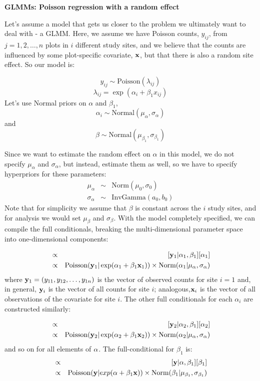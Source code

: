 {\flushleft \bf  GLMMs: Poisson regression with a random effect }

Let's assume a model that gets us closer to the problem we ultimately
want to deal with - a GLMM. Here, we assume we have Poisson counts,
$y_{ij}$, from $j=1,2,\ldots,n$ plots in $i$ different study sites,
and we believe that the counts are influenced by some plot-specific
covariate, ${\bf x}$, but that there is also a random site effect. So
our model is:
 
\[
y_{ij} \sim \mbox{Poisson}(\lambda_{ij})
\]
\[
\lambda_{ij} = \exp (\alpha_i + \beta_1 x_{ij})
\]
Let's use Normal priors on $\alpha$ and $\beta_1$,  \[
\alpha_i \sim \mbox{Normal} (\mu_{\alpha}, \sigma_{\alpha})
\]
and
\[
\beta \sim \mbox{Normal} (\mu_{\beta_1}, \sigma_{\beta_1})
\]

Since we want to estimate the random effect on $\alpha$ in this model, we do not
specify $\mu_{\alpha}$ and $\sigma_{\alpha}$, but instead, estimate them as well, so we have
to specify hyperpriors for these parameters:
\begin{eqnarray*}
\mu_{\alpha}  &\sim &  \mbox{Norm}(\mu_0, \sigma_0)  \\
\sigma_{\alpha} & \sim & \mbox{InvGamma}(a_0, b_0)
\end{eqnarray*}
Note that for simplicity we assume that $\beta$ is constant across the $i$ study sites, and for analysis we would set $\mu_{\beta}$ and $\sigma_{\beta}$.
With the model completely specified, we can compile the full conditionals,
breaking the multi-dimensional parameter space into one-dimensional
components:

\begin{eqnarray*}
[\alpha_1|\alpha_2,\alpha_3,\ldots,\alpha_i,\beta_1,{\bf y}_{1}] & \propto &   [{\bf y}_{1}|\alpha_1,\beta_1]  [\alpha_1] \\
	 & \propto  &   \mbox{Poisson}({\bf y}_{1}| \exp(\alpha_1 + \beta_1 {\bf x}_1)) \times \mbox{Norm}(\alpha_1|\mu_{\alpha} , \sigma_{\alpha})
\end{eqnarray*}
where ${\bf y}_{1} = (y_{11},y_{12}, \ldots, y_{1n})$ is the vector of
observed counts for site $i=1$ and, in general, ${\bf y}_{i}$ is the
vector of all counts for site $i$; analogous,${\bf x}_{i}$ is the
vector of all observations of the covariate for site $i$. The other full conditionals for
each $\alpha_{i}$ are constructed similarly:

\begin{eqnarray*}
[\alpha_2|\alpha_1,\alpha_3,\ldots,\alpha_i,\beta_1,{\bf y}_{2}] & \propto&  [{\bf y}_{2}|\alpha_2,\beta_1]  [\alpha_2] \\
	 & \propto  & \mbox{Poisson}({\bf y}_{2}| \exp(\alpha_2 + \beta_1 {\bf x}_2)) \times \mbox{Norm}(\alpha_2|\mu_{\alpha}, \sigma_{\alpha})
\end{eqnarray*}
and so on for all elements of ${\bf \alpha}$. The full-conditional for $\beta_1$ is:
\begin{eqnarray*}
[\beta_1|\alpha,{\bf y}] &\propto & [{\bf y}|\alpha,\beta_1]  [\beta_1] \\
	 &\propto& \mbox{Poisson}({\bf y}|exp(\alpha + \beta_1 {\bf x})) \times \mbox{Norm}(\beta_1|\mu_{\beta_1}, \sigma_{\beta_1})
\end{eqnarray*}

